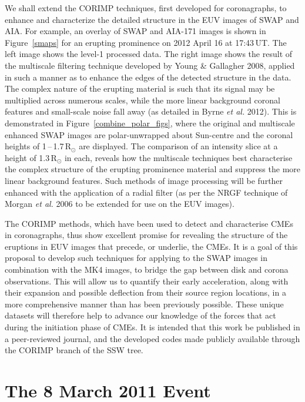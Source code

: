 \documentclass[preprint2]{aastex}
\begin{document}
We shall extend the CORIMP techniques, first developed for coronagraphs, to enhance and characterize the detailed structure in the EUV images of SWAP and AIA. For example, an overlay of SWAP and AIA-171 images is shown in Figure~\ref{smaps} for an erupting prominence on 2012 April 16 at 17:43\,UT. The left image shows the level-1 processed data. The right image shows the result of the multiscale filtering technique developed by Young \& Gallagher 2008, applied in such a manner as to enhance the edges of the detected structure in the data. The complex nature of the erupting material is such that its signal may be multiplied across numerous scales, while the more linear background coronal features and small-scale noise fall away (as detailed in Byrne \emph{et al.} 2012). This is demonstrated in Figure~\ref{combine_polar_figs}, where the original and multiscale enhanced SWAP images are polar-unwrapped about Sun-centre and the coronal heights of 1\,--\,1.7\,R$_\odot$ are displayed. The comparison of an intensity slice at a height of 1.3\,R$_\odot$ in each, reveals how the multiscale techniques best characterise the complex structure of the erupting prominence material and suppress the more linear background features. Such methods of image processing will be further enhanced with the application of a radial filter (as per the NRGF technique of Morgan \emph{et al.} 2006 to be extended for use on the EUV images).


The CORIMP methods, which have been used to detect and characterise CMEs in coronagraphs, thus show excellent promise for revealing the structure of the eruptions in EUV images that precede, or underlie, the CMEs. It is a goal of this proposal to develop such techniques for applying to the SWAP images in combination with the MK4 images, to bridge the gap between disk and corona observations. This will allow us to quantify their early acceleration, along with their expansion and possible deflection from their source region locations, in a more comprehensive manner than has been previously possible. These unique datasets will therefore help to advance our knowledge of the forces that act during the initiation phase of CMEs. It is intended that this work be published in a peer-reviewed journal, and the developed codes made publicly available through the CORIMP branch of the SSW tree.


\section{The 8 March 2011 Event}
\end{document}
